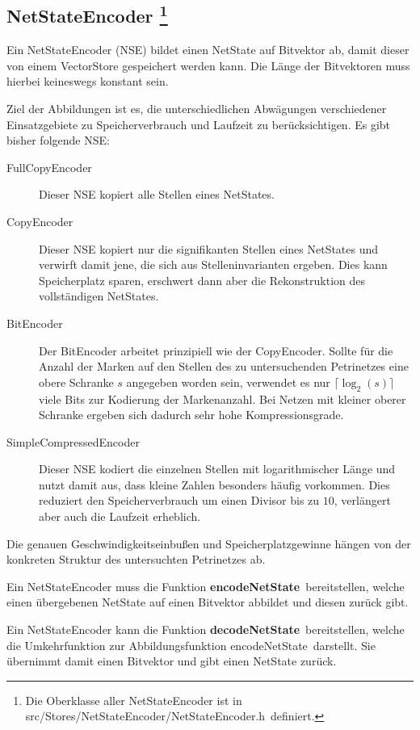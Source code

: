 \documentclass[12pt,a4paper,titlepage]{scrartcl}
\renewcommand \( {\left (}
\renewcommand \) {\right )}
\renewcommand \[ {\left [}
\renewcommand \] {\right ]}
\newcommand \Flqq {\flqq\ }
\begin{document}
\subsection{NetStateEncoder
\protect\footnote{Die Oberklasse aller NetStateEncoder ist in \frqq src/Stores/NetStateEncoder/NetStateEncoder.h\Flqq definiert.}}
\label{kap:NetStateEncoder}
Ein NetStateEncoder (NSE) bildet einen NetState auf Bitvektor ab, damit dieser von einem VectorStore gespeichert werden kann. Die Länge der Bitvektoren muss hierbei keineswegs konstant sein.

Ziel der Abbildungen ist es, die unterschiedlichen Abwägungen verschiedener Einsatzgebiete zu Speicherverbrauch und Laufzeit zu berücksichtigen. Es gibt bisher folgende NSE:
\begin{description}
\item[FullCopyEncoder] Dieser NSE kopiert alle Stellen eines NetStates.
\item[CopyEncoder] Dieser NSE kopiert nur die signifikanten Stellen eines NetStates und verwirft damit jene, die sich aus Stelleninvarianten ergeben. Dies kann Speicherplatz sparen, erschwert dann aber die Rekonstruktion des vollständigen NetStates.
\item[BitEncoder] Der BitEncoder arbeitet prinzipiell wie der CopyEncoder. Sollte für die Anzahl der Marken auf den Stellen des zu untersuchenden Petrinetzes eine obere Schranke $s$ angegeben worden sein, verwendet es nur $\lceil \log_2(s)\rceil$ viele Bits zur Kodierung der Markenanzahl. Bei Netzen mit kleiner oberer Schranke ergeben sich dadurch sehr hohe Kompressionsgrade.
\item[SimpleCompressedEncoder] Dieser NSE kodiert die einzelnen Stellen mit logarithmischer Länge und nutzt damit aus, dass kleine Zahlen besonders häufig vorkommen. Dies reduziert den Speicherverbrauch um einen Divisor bis zu $10$, verlängert aber auch die Laufzeit erheblich.
\end{description}
Die genauen Geschwindigkeitseinbußen und Speicherplatzgewinne hängen von der konkreten Struktur des untersuchten Petrinetzes ab.

Ein NetStateEncoder muss die Funktion \frqq\textbf{encodeNetState}\Flqq bereitstellen, welche einen übergebenen NetState auf einen Bitvektor abbildet und diesen zurück gibt.

Ein NetStateEncoder kann die Funktion \frqq\textbf{decodeNetState}\Flqq bereitstellen, welche die Umkehrfunktion zur Abbildungsfunktion \frqq encodeNetState\Flqq darstellt. Sie übernimmt damit einen Bitvektor und gibt einen NetState zurück.
\end{document}
